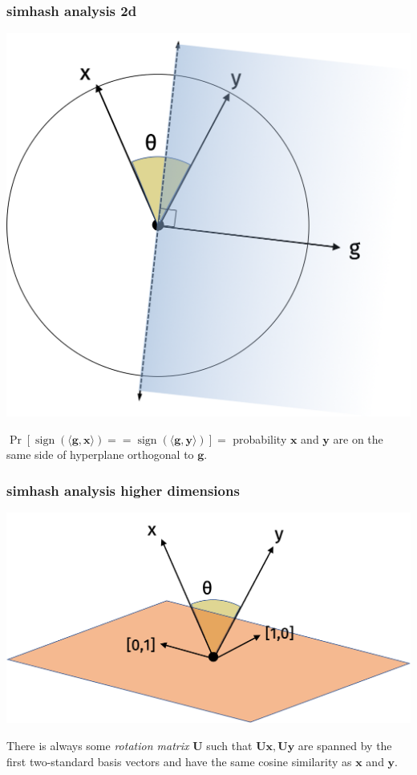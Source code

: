 \documentclass[compress]{beamer}
\newcommand{\bv}[1]{\mathbf{#1}}
\DeclareMathOperator{\sign}{sign}
\begin{document}
\begin{frame}
	\frametitle{simhash analysis 2d}
	\vspace{-.5em}
	\begin{center}
		\includegraphics[width=.55\textwidth]{simhash2.png}
	\end{center}
\vspace{-.5em}
$\Pr[\sign(\langle \bv{g}, \bv{x} \rangle) == \sign(\langle \bv{g}, \bv{y} \rangle)] = $ probability $\bv{x}$ and $\bv{y}$ are on the same side of hyperplane orthogonal to $\bv{g}$.
\end{frame}

\begin{frame}
	\frametitle{simhash analysis higher dimensions}
	\begin{center}
		\includegraphics[width=.7\textwidth]{high_dim1.png}
	\end{center}
There is always some \emph{rotation matrix} $\bv{U}$ such that $\bv{U}\bv{x},\bv{U}\bv{y}$ are spanned by the first two-standard basis vectors and have the same cosine similarity as $\bv{x}$ and $\bv{y}$.
\end{frame}
\end{document}
